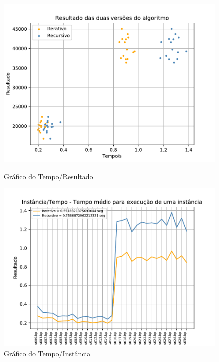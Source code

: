 \documentclass[a4paper, 12pt]{article}
\begin{document}
\begin{figure}[!htb]
    \centering
    \begin{minipage}{0.55\textwidth}
        \centering
        \includegraphics[width=1\textwidth]{../img/scatter_two.pdf}
        \caption{\footnotesize{Gráfico do Tempo/Resultado}}
        \label{fig:scatter_two} 
    \end{minipage}%
    \begin{minipage}{0.6\textwidth}
        \centering
        \includegraphics[width=1\textwidth]{../img/time_two.pdf}
        \caption{\footnotesize{Gráfico do Tempo/Instância}}
        \label{fig:time_two}
    \end{minipage}
\end{figure}
\newpage
\end{document}
